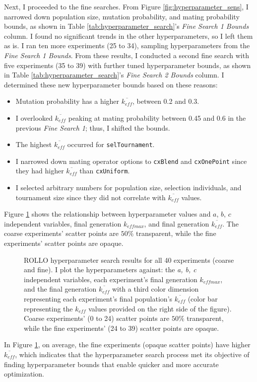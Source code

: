 Next, I proceeded to the fine searches. 
From Figure \ref{fig:hyperparameter_sens}, I narrowed down population size, 
mutation probability, and mating probability bounds, as shown in Table 
\ref{tab:hyperparameter_search}'s \textit{Fine Search 1 Bounds} column. 
I found no significant trends in the other hyperparameters, so I left them 
as is. 
I ran ten more experiments (25 to 34), sampling hyperparameters from 
the \textit{Fine Search 1 Bounds}. 
From these results, I conducted a second fine search with five experiments 
(35 to 39) with further tuned hyperparameter bounds, as shown in Table 
\ref{tab:hyperparameter_search}'s \textit{Fine Search 2 Bounds} column. 
I determined these new hyperparameter bounds based on these reasons: 
\begin{itemize}
    \item Mutation probability has a higher $\overline{k_{eff}}$, between 0.2 and 0.3.
    \item I overlooked $\overline{k_{eff}}$  peaking at mating probability between 
    0.45 and 0.6 in the previous \textit{Fine Search 1}; thus, I shifted the bounds. 
    \item The highest $\overline{k_{eff}}$ occurred for \texttt{selTournament}. 
    \item I narrowed down mating operator options to \texttt{cxBlend} and 
    \texttt{cxOnePoint} since they had higher $\overline{k_{eff}}$ than 
    \texttt{cxUniform}. 
    \item I selected arbitrary numbers for population size, 
    selection individuals, and tournament size since they did not 
    correlate with $\overline{k_{eff}}$ values. 
\end{itemize}
Figure \ref{fig:input_hyperparameters_sens} shows the relationship between 
hyperparameter values and $a$, $b$, $c$ independent variables, final generation 
$k_{eff max}$, and final generation $\overline{k_{eff}}$. 
The coarse experiments' scatter points are $50\%$ transparent, while the fine 
experiments' scatter points are opaque. 
\begin{figure}[htbp]
    \centering
    \caption{ \acrfull{ROLLO} hyperparameter search results for all 40 experiments 
    (coarse and fine). I plot the hyperparameters against: the \textit{a, b, c} independent 
    variables, each experiment's final generation $k_{eff max}$, and the final generation 
    $\overline{k_{eff}}$ with a third color dimension representing each experiment's final 
    population's $\overline{k_{eff}}$ (color bar representing the $k_{eff}$ values 
    provided on the right side of the figure). Coarse experiments' (0 to 24) scatter points 
    are $50\%$ transparent, while the fine experiments' (24 to 39) scatter points 
    are opaque. }
    \label{fig:input_hyperparameters_sens}
\end{figure}
In Figure \ref{fig:input_hyperparameters_sens}, on average, the fine experiments 
(opaque scatter points) have higher $\overline{k_{eff}}$, which indicates that the
hyperparameter search process met its objective of finding hyperparameter 
bounds that enable quicker and more accurate optimization. 

